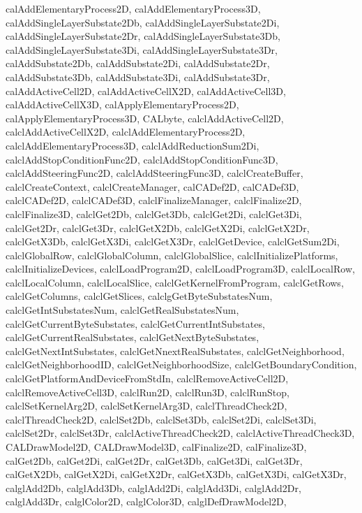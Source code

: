 {{		calAddElementaryProcess2D,
		calAddElementaryProcess3D,
		calAddSingleLayerSubstate2Db,
		calAddSingleLayerSubstate2Di,
		calAddSingleLayerSubstate2Dr,
		calAddSingleLayerSubstate3Db,
		calAddSingleLayerSubstate3Di,
		calAddSingleLayerSubstate3Dr,
		calAddSubstate2Db,
		calAddSubstate2Di,
		calAddSubstate2Dr,
		calAddSubstate3Db,
		calAddSubstate3Di,
		calAddSubstate3Dr,
		calAddActiveCell2D,
		calAddActiveCellX2D,
		calAddActiveCell3D,
		calAddActiveCellX3D,
		calApplyElementaryProcess2D,
		calApplyElementaryProcess3D,
		CALbyte,
		calclAddActiveCell2D,
		calclAddActiveCellX2D,
		calclAddElementaryProcess2D,
		calclAddElementaryProcess3D,
		calclAddReductionSum2Di,
		calclAddStopConditionFunc2D,
		calclAddStopConditionFunc3D,
		calclAddSteeringFunc2D,
		calclAddSteeringFunc3D,
		calclCreateBuffer,
		calclCreateContext,
		calclCreateManager,
		calCADef2D,
		calCADef3D,
		calclCADef2D,
		calclCADef3D,
		calclFinalizeManager,
		calclFinalize2D,
		calclFinalize3D,
		calclGet2Db,
		calclGet3Db,
		calclGet2Di,
		calclGet3Di,
		calclGet2Dr,
		calclGet3Dr,
		calclGetX2Db,
		calclGetX2Di,
		calclGetX2Dr,
		calclGetX3Db,
		calclGetX3Di,
		calclGetX3Dr,
		calclGetDevice,
		calclGetSum2Di,
		calclGlobalRow,
		calclGlobalColumn,
		calclGlobalSlice,
		calclInitializePlatforms,
		calclInitializeDevices,
		calclLoadProgram2D,
		calclLoadProgram3D,
		calclLocalRow,
		calclLocalColumn,
		calclLocalSlice,
		calclGetKernelFromProgram,
		calclGetRows,
		calclGetColumns,
		calclGetSlices,
		calclgGetByteSubstatesNum,
		calclGetIntSubstatesNum,
		calclGetRealSubstatesNum,
		calclGetCurrentByteSubstates,
		calclGetCurrentIntSubstates,
		calclGetCurrentRealSubstates,
		calclGetNextByteSubstates,
		calclGetNextIntSubstates,
		calclGetNnextRealSubstates,
		calclGetNeighborhood,
		calclGetNeighborhoodID,
		calclGetNeighborhoodSize,
		calclGetBoundaryCondition,
		calclGetPlatformAndDeviceFromStdIn,
		calclRemoveActiveCell2D,
		calclRemoveActiveCell3D,
		calclRun2D,
		calclRun3D,
		calclRunStop,
		calclSetKernelArg2D,
		calclSetKernelArg3D,
		calclThreadCheck2D,
		calclThreadCheck2D,
		calclSet2Db,
		calclSet3Db,
		calclSet2Di,
		calclSet3Di,
		calclSet2Dr,
		calclSet3Dr,
		calclActiveThreadCheck2D,
		calclActiveThreadCheck3D,
		CALDrawModel2D,
		CALDrawModel3D,
		calFinalize2D,
		calFinalize3D,
		calGet2Db,
		calGet2Di,
		calGet2Dr,
		calGet3Db,
		calGet3Di,
		calGet3Dr,
		calGetX2Db,
		calGetX2Di,
		calGetX2Dr,
		calGetX3Db,
		calGetX3Di,
		calGetX3Dr,
		calglAdd2Db,
		calglAdd3Db,
		calglAdd2Di,
		calglAdd3Di,
		calglAdd2Dr,
		calglAdd3Dr,
		calglColor2D,
		calglColor3D,
		calglDefDrawModel2D,
}}
